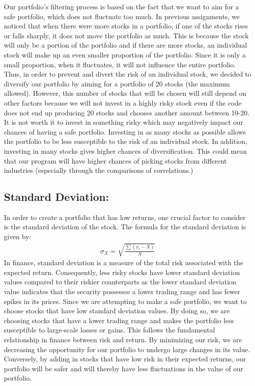 \documentclass[11pt]{article}
\begin{document}
Our portfolio's filtering process is based on the fact that we want to
aim for a safe portfolio, which does not fluctuate too much. In previous
assignments, we noticed that when there were more stocks in a portfolio,
if one of the stocks rises or falls sharply, it does not move the
portfolio as much. This is because the stock will only be a portion of
the portfolio and if there are more stocks, an individual stock will
make up an even smaller proportion of the portfolio. Since it is only a
small proportion, when it fluctuates, it will not influence the entire
portfolio. Thus, in order to prevent and divert the risk of an
individual stock, we decided to diversify our portfolio by aiming for a
portfolio of 20 stocks (the maximum allowed). However, this number of
stocks that will be chosen will still depend on other factors because we
will not invest in a highly risky stock even if the code does not end up
producing 20 stocks and chooses another amount between 10-20. It is not
worth it to invest in something risky which may negatively impact our
chances of having a safe portfolio. Investing in as many stocks as
possible allows the portfolio to be less susceptible to the risk of an
individual stock. In addition, investing in many stocks gives higher
chances of diversification. This could mean that our program will have
higher chances of picking stocks from different industries (especially
through the comparisons of correlations.)

    \hypertarget{standard-deviation}{%
\subsection{Standard Deviation:}\label{standard-deviation}}

In order to create a portfolio that has low returns, one crucial factor
to consider is the standard deviation of the stock. The formula for the
standard deviation is given by: \begin{align*}
\sigma_X=\sqrt{\frac{\sum(x_i-\overline{X})}{N}}
\end{align*} In finance, standard deviation is a measure of the total
risk associated with the expected return. Consequently, less risky
stocks have lower standard deviation values compared to their riskier
counterparts as the lower standard deviation value indicates that the
security possesses a lower trading range and has fewer spikes in its
prices. Since we are attempting to make a safe portfolio, we want to
choose stocks that have low standard deviation values. By doing so, we
are choosing stocks that have a lower trading range and makes the
portfolio less susceptible to large-scale losses or gains. This follows
the fundamental relationship in finance between risk and return. By
minimizing our risk, we are decreasing the opportunity for our portfolio
to undergo large changes in its value. Conversely, by adding in stocks
that have low risk in their expected returns, our portfolio will be
safer and will thereby have less fluctuations in the value of our
portfolio.
\end{document}
